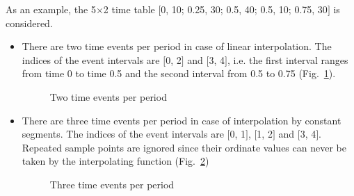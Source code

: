 \documentclass[11pt,a4paper,twocolumn]{article}
\begin{document}
As an example, the 5$\times$2 time table $[$0, 10; 0.25, 30; 0.5, 40; 0.5, 10; 0.75, 30$]$ is considered.
\begin{itemize}
\item There are two time events per period in case of linear interpolation. The indices of the event intervals are $[$0, 2$]$ and $[$3, 4$]$, i.e. the first interval ranges from time 0 to time 0.5 and the second interval from 0.5 to 0.75 (Fig.~\ref{fig:2e}).
\begin{figure}[!htbp]
\centering
{}
\caption{Two time events per period}
\label{fig:2e}
\end{figure}
\vspace{-5mm}
\item There are three time events per period in case of interpolation by constant segments. The indices of the event intervals are $[$0, 1$]$, $[$1, 2$]$ and $[$3, 4$]$. Repeated sample points are ignored since their ordinate values can never be taken by the interpolating function (Fig.~\ref{fig:3e})
\begin{figure}[!htbp]
\centering
{}
\caption{Three time events per period}
\label{fig:3e}
\end{figure}
\vspace{-5mm}
\end{itemize}
\end{document}
